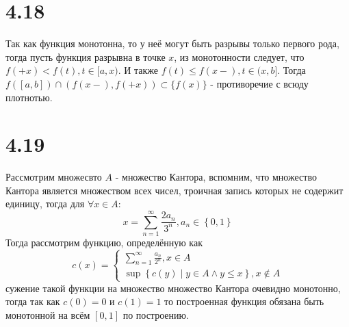 \documentclass[12pt]{article}
\begin{document}
\section{4.18}
Так как функция монотонна, то у неё могут быть разрывы только первого рода, тогда пусть 
функция разрывна в точке $x$, из монотонности следует, что $f(+x) < f(t), t \in [a, x)$. 
И также $f(t) \leq f(x-), t \in (x, b]$. Тогда $f([a, b]) \cap (f(x-), f(+x)) \subset \{f(x)\}$ - 
противоречие с всюду плотнотью.

\section{4.19}
Рассмотрим множесвто $A$ - множество Кантора, вспомним, что множество Кантора является 
множеством всех чисел, троичная запись которых не содержит единицу, тогда для $\forall x \in A$: 
\[
    x = \sum_{n=1}^{\infty} \frac{2 a_n}{3^n}, a_n \in \left\{ 0, 1 \right\} 
\]  
Тогда рассмотрим функцию, определённую как
\[
    c(x) = \begin{cases}
        \sum_{n=1}^{\infty} \frac{a_n}{2^n}, x \in A \\
        \sup \left\{c(y) \mid y \in A \land y \leq x \right\}, x \not \in A
    \end{cases}
\]
сужение такой функции на множество множество Кантора очевидно монотонно, тогда так как 
$c(0) = 0$ и $c(1) = 1$ то построенная функция обязана быть монотонной на всём $[0, 1]$ по построению.   
\end{document}

